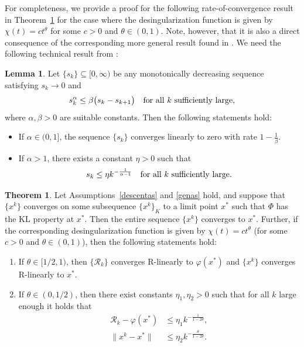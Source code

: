 \documentclass[a4paper, 12pt]{article}
\numberwithin{equation}{section}
\theoremstyle{bolddef}
\theoremstyle{definition}
\theoremstyle{boldplain}
\newtheorem{lemma}[definition]{Lemma}
\newtheorem{theorem}[definition]{Theorem}
\newcommand{\xk}{x^k}
\newcommand{\Rvalue}{\mathcal{R}}
\begin{document}
For completeness, we provide a proof for the following rate-of-convergence result in Theorem~\ref{thm:convergencerateproof} for the case where the desingularization function is given by $\chi(t) = c t^\theta$ for some $c > 0$ and $\theta \in (0, 1)$. Note, however, that it is also a direct consequence of the corresponding more general result found in \cite{Qian2024}. We need the following technical result from \cite[Lemma 1]{Aragon2018}:

\begin{lemma}\label{Lem:Aragon}
Let $ \{ s_k \} \subseteq [0, \infty )$ be any monotonically decreasing sequence satisfying $ s_k \to 0 $ and 
\begin{equation*}
	s_k^\alpha \leq \beta \big( s_k - s_{k+1} \big) \quad
	\text{for all $ k $ sufficiently large},
\end{equation*}
where $ \alpha, \beta > 0 $ are suitable constants. Then the following
statements hold:
\begin{itemize}
	\item[(a)] If $ \alpha \in (0,1] $, the sequence $ \{ s_k \} $
	converges linearly to zero with rate $ 1 - \frac{1}{\beta} $.
	\item[(b)] If $ \alpha > 1 $, there exists a constant $ \eta > 0 $
	such that 
	\begin{equation*}
		s_k \leq \eta k^{- \frac{1}{\alpha - 1}} \quad
		\text{for all $ k $ sufficiently large}.
	\end{equation*}
\end{itemize}
\end{lemma}

\begin{theorem}\label{thm:convergencerateproof}
Let Assumptions~\ref{descentas} and \ref{genas} hold, and suppose that $\{ \xk \}$ converges on some subsequence $\{ \xk\}_K$ to a limit point $x^*$ such that $\Phi$ has the KL property at $x^*$. Then the entire sequence $\{ \xk \}$ converges to $x^*$. Further, if the corresponding desingularization function is given by $\chi(t) = ct^{\theta}$ (for some $c>0$ and $\theta \in (0,1)$), then the following statements hold:
\begin{enumerate}[label=(\alph*)]
	\item If $\theta \in [1/2, 1)$, then $\{\Rvalue_k\}$ converges R-linearly to $\varphi(x^*)$ and $\{\xk\}$ converges R-linearly to $x^*$. \label{itm1}
	\item If $\theta \in (0, 1/2)$, then there exist constants $\eta_1, \eta_2 > 0$ such that for all $k$ large enough it holds that\label{itm2}
	\begin{align}
		\Rvalue_k - \varphi(x^*) &\leq \eta_1 k^{-\frac{1}{1-2\theta}},\\
		\|\xk - x^*\| &\leq \eta_2 k^{-\frac{\theta}{1-2\theta}}.
	\end{align}
\end{enumerate}
\end{theorem}
\end{document}
